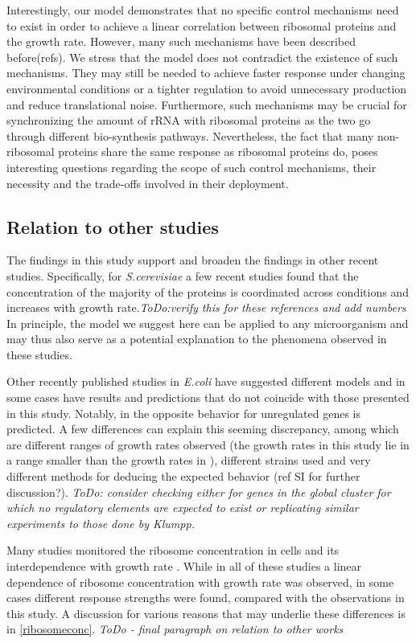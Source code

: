 \documentclass[notitlepage]{article}
\begin{document}
Interestingly, our model demonstrates that no specific control mechanisms need to exist in order to achieve a linear correlation between ribosomal proteins and the growth rate.
However, many such mechanisms have been described before(refs).
We stress that the model does not contradict the existence of such mechanisms.
They may still be needed to achieve faster response under changing environmental conditions or a tighter regulation to avoid unnecessary production and reduce translational noise.
Furthermore, such mechanisms may be crucial for synchronizing the amount of rRNA with ribosomal proteins as the two go through different bio-synthesis pathways.
Nevertheless, the fact that many non-ribosomal proteins share the same response as ribosomal proteins do, poses interesting questions regarding the scope of such control mechanisms, their necessity and the trade-offs involved in their deployment.

\subsection{Relation to other studies}
The findings in this study support and broaden the findings in other recent studies.
Specifically, for \emph{S.cerevisiae} a few recent studies found that the concentration of the majority of the proteins is coordinated across conditions \cite{Keren2013a, Gasch2000, Brauer2008a} and increases with growth rate.\emph{ToDo:verify this for these references and add numbers} 
In principle, the model we suggest here can be applied to any microorganism and may thus also serve as a potential explanation to the phenomena observed in these studies.

Other recently published studies in \emph{E.coli} have suggested different models and in some cases have results  and predictions that do not coincide with those presented in this study.
Notably, in \cite{Klumpp2009a} the opposite behavior for unregulated genes is predicted.
A few differences can explain this seeming discrepancy, among which are different ranges of growth rates observed (the growth rates in this study lie in a range smaller than the growth rates in \cite{Klumpp2009a}), different strains used and very different methods for deducing the expected behavior (ref SI for further discussion?).
\emph{ToDo: consider checking either for genes in the global cluster for which no regulatory elements are expected to exist or replicating similar experiments to those done by Klumpp.} 

Many studies monitored the ribosome concentration in cells and its interdependence with growth rate \cite{Scott2010, Bremer1987, Schaechter1958, 1974, Zaslaver2009, eco-sal}.
While in all of these studies a linear dependence of ribosome concentration with growth rate was observed, in some cases different response strengths were found, compared with the observations in this study.
A discussion for various reasons that may underlie these differences is in \ref{ribosomeconc}.
\emph{ToDo - final paragraph on relation to other works}
\end{document}
